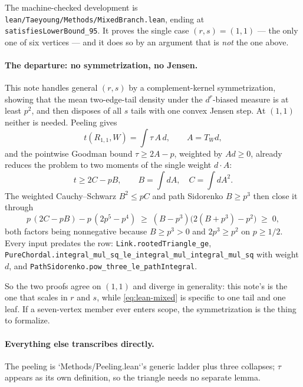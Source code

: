 \documentclass[11pt]{article}
\begin{document}
The machine-checked development is
\texttt{lean/Taeyoung/Methods/MixedBranch.lean}, ending at
\texttt{satisfiesLowerBound\_95}.  It proves the single case
$(r,s)=(1,1)$ --- the only one of six vertices --- and it does so by an
argument that is \emph{not} the one above.

\paragraph{The departure: no symmetrization, no Jensen.}
This note handles general $(r,s)$ by a complement-kernel symmetrization,
showing that the mean two-edge-tail density under the $d^{r}$-biased measure is
at least $p^{2}$, and then disposes of all $s$ tails with one convex Jensen
step.  At $(1,1)$ neither is needed.  Peeling gives
\[
 t(R_{1,1},W)=\int\tau\,A\,d,\qquad A=T_Wd,
\]
and the pointwise Goodman bound $\tau\geq2A-p$, weighted by $Ad\geq0$, already
reduces the problem to two moments of the single weight $d\cdot A$:
\[
 t\geq2C-pB,\qquad B=\int dA,\quad C=\int dA^{2}.
\]
The weighted Cauchy--Schwarz $B^{2}\leq pC$ and path Sidorenko $B\geq p^{3}$
then close it through
\begin{equation}
 p\,(2C-pB)-p\,(2p^{5}-p^{4})\;\geq\;(B-p^{3})\bigl(2(B+p^{3})-p^{2}\bigr)\;\geq\;0,
 \label{eq:lean-mixed}
\end{equation}
both factors being nonnegative because $B\geq p^{3}>0$ and $2p^{3}\geq p^{2}$ on
$p\geq1/2$.  Every input predates the row:
\texttt{Link.rootedTriangle\_ge},
\texttt{PureChordal.integral\_mul\_sq\_le\_integral\_mul\_integral\_mul\_sq}
with weight $d$, and \texttt{PathSidorenko.pow\_three\_le\_pathIntegral}.

So the two proofs agree on $(1,1)$ and diverge in generality: this note's is
the one that scales in $r$ and $s$, while \eqref{eq:lean-mixed} is specific to
one tail and one leaf.  If a seven-vertex member ever enters scope, the
symmetrization is the thing to formalize.

\paragraph{Everything else transcribes directly.}
The peeling is `Methods/Peeling.lean`'s generic ladder plus three collapses;
$\tau$ appears as its own definition, so the triangle needs no separate lemma.
\end{document}

